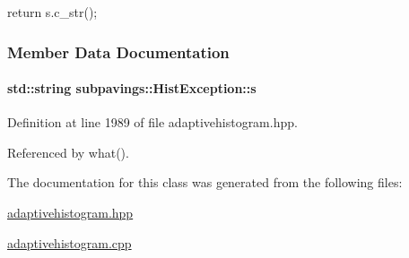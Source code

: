 \begin{DoxyCode}
{ return s.c_str(); }
\end{DoxyCode}


\subsubsection{\-Member \-Data \-Documentation}
\hypertarget{classsubpavings_1_1HistException_a0fa63652ca7c257562f3c590805d5d06}{
\paragraph[{s}]{\setlength{\rightskip}{0pt plus 5cm}std\-::string {\bf subpavings\-::\-Hist\-Exception\-::s}}}\label{classsubpavings_1_1HistException_a0fa63652ca7c257562f3c590805d5d06}


\-Definition at line 1989 of file adaptivehistogram.\-hpp.



\-Referenced by what().



\-The documentation for this class was generated from the following files\-:\begin{DoxyCompactItemize}
\item 
\hyperlink{adaptivehistogram_8hpp}{adaptivehistogram.\-hpp}\item 
\hyperlink{adaptivehistogram_8cpp}{adaptivehistogram.\-cpp}\end{DoxyCompactItemize}
